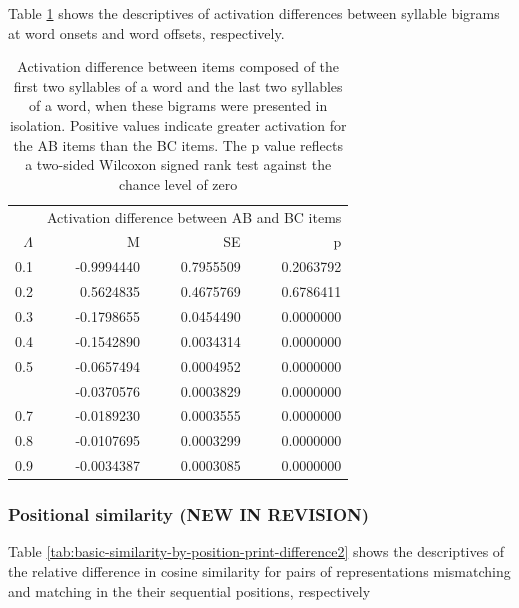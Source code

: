 \documentclass[
]{article}
\begin{document}
Table
\ref{tab:basic-experiment-global-print-difference-between-parts-of-word2}
shows the descriptives of activation differences between syllable
bigrams at word onsets and word offsets, respectively.

\begin{table}

\caption{\label{tab:basic-experiment-global-print-difference-between-parts-of-word2}Activation difference between items composed of the first two syllables of a word and the last two syllables of a word, when these bigrams were presented in isolation. Positive values indicate greater activation for the AB items than the BC items. The p value reflects a two-sided Wilcoxon signed rank test against the chance level of zero}
\centering
\begin{tabular}[t]{rrrr}
\toprule
\multicolumn{1}{c}{ } & \multicolumn{3}{c}{Activation difference between AB and BC items} \\
\cmidrule(l{3pt}r{3pt}){2-4}
$\Lambda$ & M & SE & p\\
\midrule
0.1 & -0.9994440 & 0.7955509 & 0.2063792\\
0.2 & 0.5624835 & 0.4675769 & 0.6786411\\
0.3 & -0.1798655 & 0.0454490 & 0.0000000\\
0.4 & -0.1542890 & 0.0034314 & 0.0000000\\
0.5 & -0.0657494 & 0.0004952 & 0.0000000\\
\addlinespace
0.6 & -0.0370576 & 0.0003829 & 0.0000000\\
0.7 & -0.0189230 & 0.0003555 & 0.0000000\\
0.8 & -0.0107695 & 0.0003299 & 0.0000000\\
0.9 & -0.0034387 & 0.0003085 & 0.0000000\\
\bottomrule
\end{tabular}
\end{table}

\hypertarget{positional-similarity-new-in-revision}{%
\subsubsection{Positional similarity (NEW IN
REVISION)}\label{positional-similarity-new-in-revision}}

Table \ref{tab:basic-similarity-by-position-print-difference2} shows the
descriptives of the relative difference in cosine similarity for pairs
of representations mismatching and matching in the their sequential
positions, respectively
\end{document}

